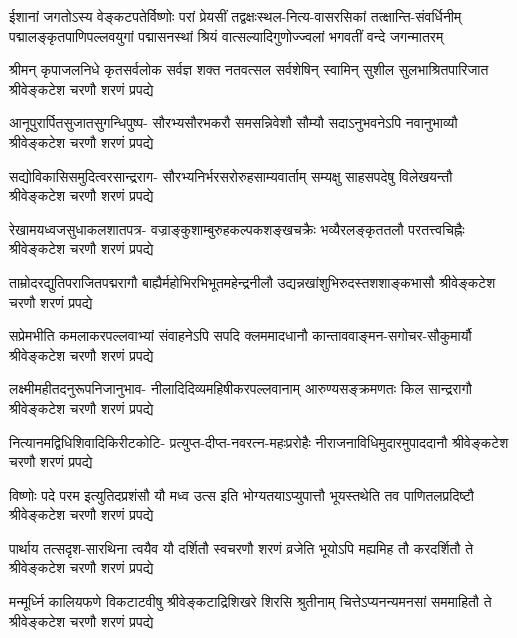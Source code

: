 
\fourlineindentedshloka
{ईशानां जगतोऽस्य वेङ्कटपतेर्विष्णोः परां प्रेयसीं}
{तद्वक्षःस्थल-नित्य-वासरसिकां तत्क्षान्ति-संवर्धिनीम्}
{पद्मालङ्कृतपाणिपल्लवयुगां पद्मासनस्थां श्रियं}
{वात्सल्यादिगुणोज्ज्वलां भगवतीं वन्दे जगन्मातरम्}

\begin{AutoCols}[\maxColumns]
\adjustShlokaSpaceSkip

\fourlineindentedshloka
{श्रीमन् कृपाजलनिधे कृतसर्वलोक}
{सर्वज्ञ शक्त नतवत्सल सर्वशेषिन्}
{स्वामिन् सुशील सुलभाश्रितपारिजात}
{श्रीवेङ्कटेश चरणौ शरणं प्रपद्ये}

\fourlineindentedshloka
{आनूपुरार्पितसुजातसुगन्धिपुष्प-}
{सौरभ्यसौरभकरौ समसन्निवेशौ}
{सौम्यौ सदाऽनुभवनेऽपि नवानुभाव्यौ}
{श्रीवेङ्कटेश चरणौ शरणं प्रपद्ये}

\fourlineindentedshloka
{सद्योविकासिसमुदित्वरसान्द्रराग-}
{सौरभ्यनिर्भरसरोरुहसाम्यवार्ताम्}
{सम्यक्षु साहसपदेषु विलेखयन्तौ}
{श्रीवेङ्कटेश चरणौ शरणं प्रपद्ये}

\fourlineindentedshloka
{रेखामयध्वजसुधाकलशातपत्र-}
{वज्राङ्कुशाम्बुरुहकल्पकशङ्खचक्रैः}
{भव्यैरलङ्कृततलौ परतत्त्वचिह्नैः}
{श्रीवेङ्कटेश चरणौ शरणं प्रपद्ये}

\fourlineindentedshloka
{ताम्रोदरद्युतिपराजितपद्मरागौ}
{बाह्यैर्महोभिरभिभूतमहेन्द्रनीलौ}
{उद्यन्नखांशुभिरुदस्तशशाङ्कभासौ}
{श्रीवेङ्कटेश चरणौ शरणं प्रपद्ये}

\fourlineindentedshloka
{सप्रेमभीति कमलाकरपल्लवाभ्यां}
{संवाहनेऽपि सपदि क्लममादधानौ}
{कान्ताववाङ्मन-सगोचर-सौकुमार्यौ}
{श्रीवेङ्कटेश चरणौ शरणं प्रपद्ये}

\fourlineindentedshloka
{लक्ष्मीमहीतदनुरूपनिजानुभाव-}
{नीलादिदिव्यमहिषीकरपल्लवानाम्}
{आरुण्यसङ्क्रमणतः किल सान्द्ररागौ}
{श्रीवेङ्कटेश चरणौ शरणं प्रपद्ये}

\fourlineindentedshloka
{नित्यानमद्विधिशिवादिकिरीटकोटि-}
{प्रत्युप्त-दीप्त-नवरत्न-महःप्ररोहैः}
{नीराजनाविधिमुदारमुपाददानौ}
{श्रीवेङ्कटेश चरणौ शरणं प्रपद्ये}

\fourlineindentedshloka
{विष्णोः पदे परम इत्युतिदप्रशंसौ}
{यौ मध्व उत्स इति भोग्यतयाऽप्युपात्तौ}
{भूयस्तथेति तव पाणितलप्रदिष्टौ}
{श्रीवेङ्कटेश चरणौ शरणं प्रपद्ये}

\fourlineindentedshloka
{पार्थाय तत्सदृश-सारथिना त्वयैव}
{यौ दर्शितौ स्वचरणौ शरणं व्रजेति}
{भूयोऽपि मह्यमिह तौ करदर्शितौ ते}
{श्रीवेङ्कटेश चरणौ शरणं प्रपद्ये}

\fourlineindentedshloka
{मन्मूर्ध्नि कालियफणे विकटाटवीषु}
{श्रीवेङ्कटाद्रिशिखरे शिरसि श्रुतीनाम्}
{चित्तेऽप्यनन्यमनसां सममाहितौ ते}
{श्रीवेङ्कटेश चरणौ शरणं प्रपद्ये}


\end{AutoCols}
